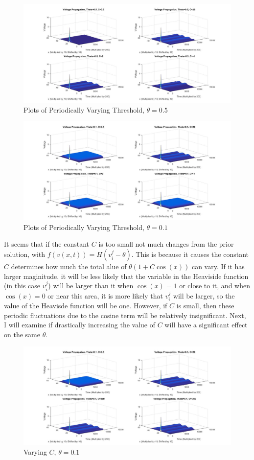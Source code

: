 \documentclass[12pt]{article}
\begin{document}
\begin{figure}[H]
  \includegraphics[width=\linewidth]{thetatwo3.jpg}
  \caption{Plots of Periodically Varying Threshold, $\theta=0.5$}
  \label{fig:sketch8}
\end{figure}
\begin{figure}[H]
  \includegraphics[width=\linewidth]{thetathree3.jpg}
  \caption{Plots of Periodically Varying Threshold, $\theta=0.1$}
  \label{fig:sketch9}
\end{figure}
It seems that if the constant $C$ is too small not much changes from the prior solution, with $f(v(x,t))=H(v^j_i-\theta)$. This is because it causes the constant $C$ determines how much the total alue of $\theta(1+C\cos(x))$ can vary. If it has larger maginitude, it will be less likely that the variable in the Heaviside function (in this case $v_i^j$) will be larger than it when $\cos(x)=1$ or close to it, and when $\cos(x)=0$ or near this area, it is more likely that $v_i^j$ will be larger, so the value of the Heavisde function will be one. However, if $C$ is small, then these periodic fluctuations due to the cosine term will be relatively insignificant. Next, I will examine if drastically increasing the value of $C$ will have a significant effect on the same $\theta$.
\begin{figure}[H]
  \includegraphics[width=\linewidth]{plotsomething.jpg}
  \caption{Varying $C$, $\theta=0.1$}
  \label{fig:sketch10}
\end{figure}
\end{document}
